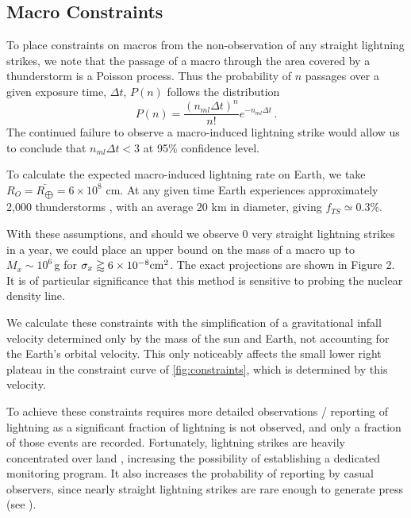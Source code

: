 \documentclass[%
reprint,
 amsmath,amssymb,
 aps,
 prd,
]{revtex4-2}
\begin{document}

    \subsection{Macro Constraints} %
    \label{sub:macro_constraints_on_earth}

        To place constraints on macros from the non-observation of any straight lightning strikes, we note that the passage of a macro through the area covered by a thunderstorm is a Poisson process. Thus the probability of $n$ passages over a given exposure time, $\Delta t$, $P(n)$ follows the distribution
        \begin{equation}\label{eq:poisson}
            P(n) = \frac{\left({n_{ml} \Delta t}\right)^n}{n!} e^{-n_{ml} \Delta t}\,.
        \end{equation}
        The continued failure to observe a macro-induced lightning strike would allow us to conclude that $n_{ml}\Delta t<3$ at 95$\%$ confidence level.

        To calculate the expected macro-induced lightning rate on Earth,  we take $R_{O} = \bar{R_{\bigoplus}} = 6 \times 10^8$ cm.  At any given time Earth experiences approximately 2,000 thunderstorms \citep{NatGeo}, with an average $20$ km in diameter, giving $f_{TS}\simeq 0.3\%$.

        With these assumptions, and should we observe 0 very straight lightning strikes in a year, we could place an upper bound on the mass of a macro up to $M_x \sim 10^6\,$g for $\sigma_x\gtrapprox6\times10^{-8}{\rm cm}^2$. The exact projections are shown in Figure 2. It is of particular significance that this method is sensitive to probing the nuclear density line.
        
        We calculate these constraints with the simplification of a gravitational infall velocity determined only by the mass of the sun and Earth, not accounting for the Earth's orbital velocity. This only noticeably affects the small lower right plateau in the constraint curve of \ref{fig:constraints}, which is determined by this velocity.

        To achieve these constraints requires more detailed observations / reporting of lightning as a significant fraction of lightning is not observed, and only a fraction of those events are recorded. Fortunately, lightning strikes are heavily concentrated over land \citep{Christian2003},  increasing the possibility of establishing a dedicated monitoring program.  It also increases the probability of reporting by casual observers, since nearly straight lightning strikes are rare enough to generate press (see \cite{Zimbabwe}).
\end{document}
